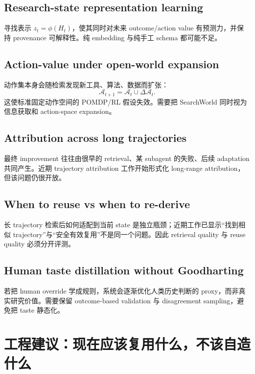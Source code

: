 \documentclass[11pt,a4paper]{ctexart}
\newcommand{\A}{\mathcal{A}}
\begin{document}
\subsection{Research-state representation learning}
寻找表示 $z_t=\phi(H_t)$，使其同时对未来 outcome/action value 有预测力，并保持 provenance 可解释性。纯 embedding 与纯手工 schema 都可能不足。

\subsection{Action-value under open-world expansion}
动作集本身会随检索发现新工具、算法、数据而扩张：
\begin{equation}
 \A_{t+1}=\A_t\cup\Delta\A_t.
\end{equation}
这使标准固定动作空间的 POMDP/RL 假设失效。需要把 SearchWorld 同时视为信息获取和 action-space expansion。

\subsection{Attribution across long trajectories}
最终 improvement 往往由很早的 retrieval、某 subagent 的失败、后续 adaptation 共同产生。近期 trajectory attribution 工作开始形式化 long-range attribution，但该问题仍很开放\parencite{chen2026attribution}。

\subsection{When to reuse vs when to re-derive}
长 trajectory 检索后如何适配到当前 state 是独立瓶颈；近期工作已显示“找到相似 trajectory”与“安全有效复用”不是同一个问题\parencite{li2026qcr}。因此 retrieval quality 与 reuse quality 必须分开评测。

\subsection{Human taste distillation without Goodharting}
若把 human override 学成规则，系统会逐渐优化人类历史判断的 proxy，而非真实研究价值。需要保留 outcome-based validation 与 disagreement sampling，避免把 taste 静态化。

\section{工程建议：现在应该复用什么，不该自造什么}
\end{document}
